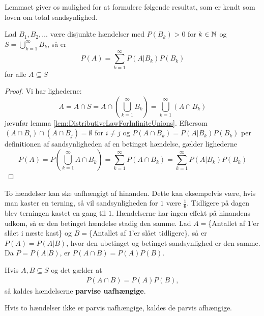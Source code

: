 Lemmaet giver os mulighed for at formulere følgende resultat, som er kendt som loven om total sandsynlighed.
\begin{thm} \label{thm:LPT}
Lad $B_1, B_2, \ldots$ være disjunkte hændelser med $P(B_k) > 0$ for $k \in \mathbb{N}$ og $S = \bigcup^\infty_{k = 1} B_k$, så er
\begin{equation*}
    P(A) = \sum^\infty_{k = 1} P(A | B_k)P(B_k)
\end{equation*}
for alle $A \subseteq S$
\end{thm}
\begin{proof}
Vi har lighederne:
\begin{equation*}
    A = A \cap S = A \cap \left( \bigcup^\infty_{k = 1} B_k \right) = \bigcup^\infty_{k = 1} (A \cap B_k)
\end{equation*}
jævnfør lemma \ref{lem:DistributiveLawForInfiniteUnions}. Eftersom $(A \cap B_i) \cap (A \cap B_j) = \emptyset$ for $i \neq j$ og $P(A \cap B_k) = P(A | B_k) P(B_k)$ per definitionen af sandsynligheden af en betinget hændelse, gælder lighederne
\begin{equation*}
    P(A) = P\left( \bigcup^\infty_{k = 1} A \cap B_k\right)= \sum^\infty_{k = 1} P(A \cap B_k) = \sum^\infty_{k = 1} P(A | B_k)P(B_k)
\end{equation*}
\end{proof}

To hændelser kan ske uafhængigt af hinanden. Dette kan eksempelvis være, hvis man kaster en terning, så vil sandsynligheden for $1$ være $\frac{1}{6}$. Tidligere på dagen blev terningen kastet en gang til $1$. Hændelserne har ingen effekt på hinandens udkom, så er den betinget hændelse stadig den samme. Lad $A=$\{Antallet af $1$'er slået i næste kast\} og $B=$\{Antallet af $1$'er slået tidligere\}, så er $P(A)=P(A|B)$, hvor den ubetinget og betinget sandsynlighed er den samme.  Da $P=P(A|B)$, er  $P(A\cap B)=P(A)P(B)$. 
\begin{defn} \label{Def:def1.5} %
Hvis $A, B \subseteq S$ og det gælder at
\begin{align*}
    P(A\cap B)=P(A)P(B),
\end{align*}
så kaldes hændelserne \textbf{parvise uafhængige}.
\end{defn}
Hvis to hændelser ikke er parvis uafhængige, kaldes de parvis afhængige.

